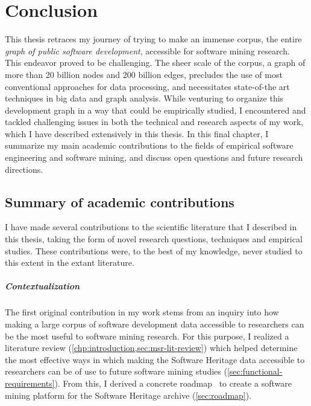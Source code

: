 \chapter{Conclusion}

This thesis retraces my journey of trying to make an immense corpus, the
entire \emph{graph of public software development}, accessible for software
mining research. This endeavor proved to be challenging. The sheer scale of the
corpus, a graph of more than 20 billion nodes and 200 billion edges, precludes
the use of most conventional approaches for data processing, and necessitates
state-of-the art techniques in big data and graph analysis.
While venturing to organize this development graph in a way that could be
empirically studied, I encountered and tackled challenging issues in both the
technical and research aspects of my work, which I have described extensively
in this thesis. In this final chapter, I summarize my main academic
contributions to the fields of empirical software engineering and software
mining, and discuss open questions and future research directions.

\section{Summary of academic contributions}

I have made several contributions to the scientific literature that I described
in this thesis, taking the form of novel research questions, techniques and
empirical studies. These contributions were, to the best of my knowledge, never
studied to this extent in the extant literature.

\paragraph*{Contextualization}

The first original contribution in my work stems from an inquiry into how
making a large corpus of software development data accessible to researchers
can be the most useful to software mining research. For this purpose, I
realized a literature review (\cref{chp:introduction,sec:msr-lit-review}) which
helped determine the most effective ways in which making the Software Heritage
data accessible to researchers can be of use to future software mining studies
(\cref{sec:functional-requirements}). From this, I derived a concrete
roadmap~\cite{swh-benevol2018-universal-analysis} to create a software mining
platform for the Software Heritage archive (\cref{sec:roadmap}).


